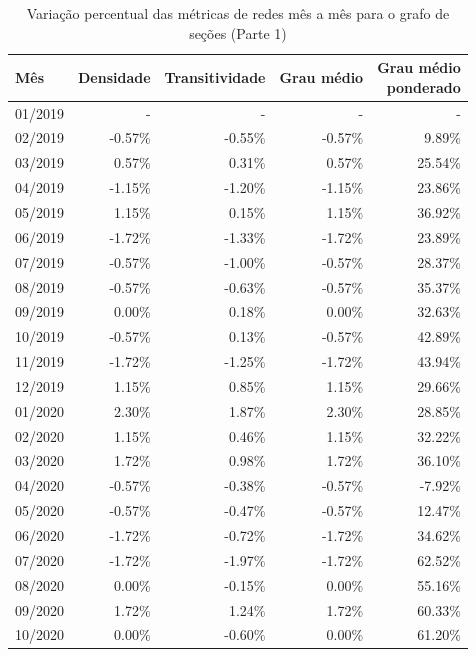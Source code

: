 \begin{table}[htb]
\centering
\caption{Variação percentual das métricas de redes mês a mês para o grafo de seções (Parte 1)}
\label{tab:metricas-redes-pandemia:grafo-mensal-por-secao1}
\begin{tabular}{l|rrrr}
\toprule
Mês & Densidade & Transitividade & Grau médio & \shortstack{Grau médio\\ponderado} \\
\midrule
01/2019 &  - &  - &  - &  - \\
02/2019 & -0.57\% & -0.55\% & -0.57\% &  9.89\%\\
03/2019 &  0.57\% &  0.31\% &  0.57\% & 25.54\%\\
04/2019 & -1.15\% & -1.20\% & -1.15\% & 23.86\%\\
05/2019 &  1.15\% &  0.15\% &  1.15\% & 36.92\%\\
06/2019 & -1.72\% & -1.33\% & -1.72\% & 23.89\%\\
07/2019 & -0.57\% & -1.00\% & -0.57\% & 28.37\%\\
08/2019 & -0.57\% & -0.63\% & -0.57\% & 35.37\%\\
09/2019 &  0.00\% &  0.18\% &  0.00\% & 32.63\%\\
10/2019 & -0.57\% &  0.13\% & -0.57\% & 42.89\%\\
11/2019 & -1.72\% & -1.25\% & -1.72\% & 43.94\%\\
12/2019 &  1.15\% &  0.85\% &  1.15\% & 29.66\%\\
01/2020 &  2.30\% &  1.87\% &  2.30\% & 28.85\%\\
02/2020 &  1.15\% &  0.46\% &  1.15\% & 32.22\%\\
03/2020 &  1.72\% &  0.98\% &  1.72\% & 36.10\%\\
04/2020 & -0.57\% & -0.38\% & -0.57\% & -7.92\%\\
05/2020 & -0.57\% & -0.47\% & -0.57\% & 12.47\%\\
06/2020 & -1.72\% & -0.72\% & -1.72\% & 34.62\%\\
07/2020 & -1.72\% & -1.97\% & -1.72\% & 62.52\%\\
08/2020 &  0.00\% & -0.15\% &  0.00\% & 55.16\%\\
09/2020 &  1.72\% &  1.24\% &  1.72\% & 60.33\%\\
10/2020 &  0.00\% & -0.60\% &  0.00\% & 61.20\%\\
\bottomrule
\end{tabular}
\fdadospesquisa
\end{table}

